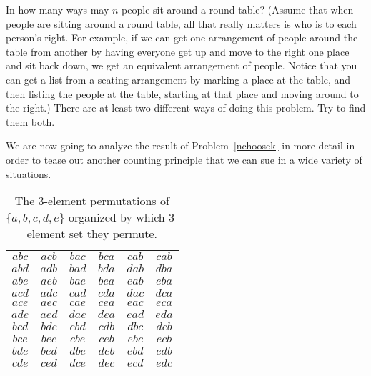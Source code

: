 \iteme In how many ways may $n$ people sit around a round
table?  (Assume
 that when people are sitting around a round table, all that
really matters is who is to each person's right.  For example, if we can get
one arrangement of people around the table from another by having everyone
get up and move to the right one place and sit back down, we get an
equivalent arrangement of people.  Notice that you can get a
list from a seating arrangement by marking a place at the
table, and then listing the people at the table, starting at
that place and moving around to the right.)  There are at least two
different ways of doing this problem.   Try to find them both.
\label{roundtable}

\ep

We are now going to analyze the result of Problem~\ref{nchoosek} in
more detail in order to tease out another counting principle that we
can sue in a wide variety of situations.

\begin{table}[h]
  \centering
  \caption{The $3$-element permutations of $\{a,b,c,d,e\}$ organized
    by which $3$-element set they permute.}
  \label{tab:permsof3}
  \begin{tabular}{cccccc}
    $abc$&$acb$&$bac$&$bca$&$cab$&$cab$\\
    $abd$ & $adb$ & $bad$ & $bda$& $dab$ & $dba$\\
    $abe$ & $aeb$ & $bae$ & $bea$& $eab$ & $eba$\\
    $acd$ & $adc$ & $cad$ & $cda$& $dac$ & $dca$\\
    $ace$ & $aec$ & $cae$ & $cea$& $eac$ & $eca$\\
    $ade$ & $aed$ & $dae$ & $dea$& $ead$ & $eda$\\
    $bcd$ & $bdc$ & $cbd$ & $cdb$& $dbc$ & $dcb$\\
    $bce$ & $bec$ & $cbe$ & $ceb$& $ebc$ & $ecb$\\
    $bde$ & $bed$ & $dbe$ & $deb$& $ebd$ & $edb$\\
    $cde$ & $ced$ & $dce$ & $dec$& $ecd$ & $edc$
  \end{tabular}
\end{table}

